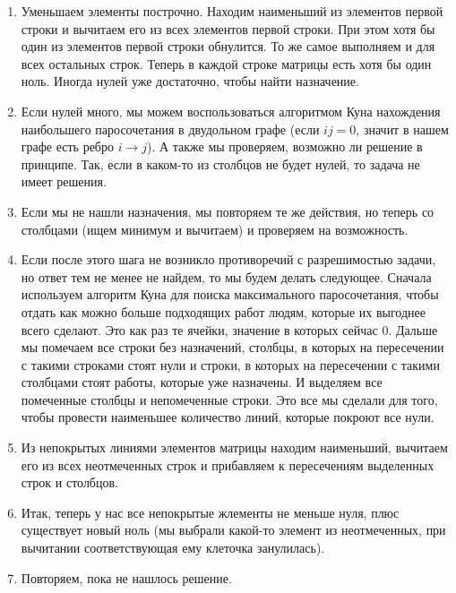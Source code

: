 \begin{enumerate}
	\item Уменьшаем элементы построчно. Находим наименьший из элементов первой строки и вычитаем его из всех элементов первой строки. При этом хотя бы один из элементов первой строки обнулится. 
	То же самое выполняем и для всех остальных строк. Теперь в каждой строке матрицы есть хотя бы один ноль. Иногда нулей уже достаточно, чтобы найти назначение.
    \item Если нулей много, мы можем воспользоваться алгоритмом Куна нахождения наибольшего паросочетания в двудольном графе (если $ij = 0$, значит в нашем графе есть ребро $i \to j$). А также мы проверяем,
    возможно ли решение в принципе. Так, если в каком-то из столбцов не будет нулей, то задача не имеет решения.
    \item Если мы не нашли назначения, мы повторяем те же действия, но теперь со столбцами (ищем минимум и вычитаем) и проверяем на возможность.
    \item Если после этого шага не возникло противоречий с разрешимостью задачи, но ответ тем не менее не найдем, то мы будем делать следующее. Сначала используем алгоритм Куна для поиска максимального
    паросочетания, чтобы отдать как можно больше подходящих работ людям, которые их выгоднее всего сделают. Это как раз те ячейки, значение в которых сейчас 0. Дальше мы помечаем все строки без назначений,
    столбцы, в которых на пересечении с такими строками стоят нули и строки, в которых на пересечении с такими столбцами стоят работы, которые уже назначены. И выделяем все помеченные столбцы и непомеченные 
    строки. Это все мы сделали для того, чтобы провести наименьшее количество линий, которые покроют все нули.
    \item Из непокрытых линиями элементов матрицы находим наименьший, вычитаем его из всех неотмеченных строк и прибавляем к пересечениям выделенных строк и столбцов.
    \item Итак, теперь у нас все непокрытые жлементы не меньше нуля, плюс существует новый ноль (мы выбрали какой-то элемент из неотмеченных, при вычитании соответствующая ему клеточка занулилась).
    \item Повторяем, пока не нашлось решение.
\end{enumerate}
 

 
